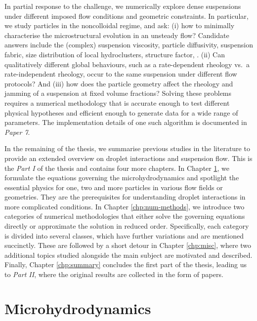 \medskip
In partial response to the challenge, we numerically explore dense suspensions under different imposed flow conditions and geometric constraints.
In particular, we study particles in the noncolloidal regime, and ask:
(i) how to minimally characterise the microstructural evolution in an unsteady flow?
Candidate answers include the (complex) suspension viscosity, particle diffusivity, suspension fabric, size distribution of local hydroclusters, structure factor, \etc \citep{Brady_Bossis1988, Sal03, Ness_Xing_Eiser_2017}.
(ii) Can qualitatively different global behaviours, such as a rate-dependent rheology vs.\ a rate-independent rheology,
occur to the same suspension under different flow protocols? And
(iii) how does the particle geometry affect the rheology and jamming of a suspension at fixed volume fractions?
Solving these problems requires a numerical methodology that is accurate enough to test different physical hypotheses and
efficient enough to generate data for a wide range of parameters.
The implementation details of one such algorithm is documented in \emph{Paper 7}.


\thesisstructure
In the remaining of the thesis, we summarise previous studies in the literature to provide an extended overview on droplet interactions and suspension flow.
This is the \emph{Part I} of the thesis and contains four more chapters.
In Chapter \ref{chp:micro-hydro}, we formulate the equations governing the microhydrodynamics and
spotlight the essential physics for one, two and more particles in various flow fields or geometries.
They are the prerequisites for understanding droplet interactions in more complicated conditions.
In Chapter \ref{chp:num-methods}, we introduce two categories of numerical methodologies that
either solve the governing equations directly or approximate the solution in reduced order.
Specifically, each category is divided into several classes, which have further variations and are mentioned succinctly.
These are followed by a short detour in Chapter \ref{chp:misc},
where two additional topics studied alongside the main subject are motivated and described.
Finally, Chapter \ref{chp:summary} concludes the first part of the thesis,
leading us to \emph{Part II}, where the original results are collected in the form of papers.


\chapter{Microhydrodynamics}  \label{chp:micro-hydro}


